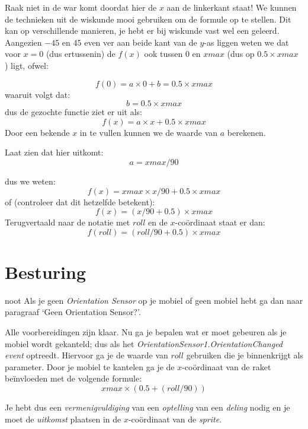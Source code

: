 Raak niet in de war komt doordat hier de $x$ aan de linkerkant staat! We kunnen de technieken uit de wiskunde mooi gebruiken om de formule op te stellen. Dit kan op verschillende manieren, je hebt er bij wiskunde vast wel een geleerd. Aangezien $-45$ en $45$ even ver aan beide kant van de $y$-as liggen weten we dat voor $x=0$ (dus ertussenin) de $f(x)$ ook tussen $0$ en $xmax$ (dus op $ 0.5 \times xmax $ ) ligt, ofwel:


\[
	f(0) = a \times 0 + b = 0.5 \times  xmax 
\]
waaruit volgt dat:
\[
	b = 0.5 \times xmax
\]
dus de gezochte functie ziet er uit als:
\[
	f(x) = a \times x + 0.5 \times xmax
\]
Door een bekende $x$ in te vullen kunnen we de waarde van $a$ berekenen. 

\begin{opgave}
   \opgVraag
	Laat zien dat hier uitkomt:
\[
	a=xmax/90
\]
\end{opgave}
dus we weten:
\[
	f(x) = xmax \times x/90 + 0.5 \times xmax
\]
of (controleer dat dit hetzelfde betekent):
\[
	f(x) = (x/90 + 0.5)  \times  xmax
\]
Terugvertaald naar de notatie met $roll$ en de $x$-co\"ordinaat staat er dan:
\[
	f(roll) = (roll/90 + 0.5)  \times  xmax
\]


\section{Besturing}
\begin{derivation}{noot}
  Als je geen \emph{Orientation Sensor} op je mobiel of geen mobiel hebt ga dan naar paragraaf `Geen Orientation Sensor?'.
\end{derivation}

Alle voorbereidingen zijn klaar. Nu ga je bepalen wat er moet gebeuren als je mobiel wordt gekanteld; dus als het \emph{OrientationSensor1.OrientationChanged} \emph{event} optreedt. Hiervoor ga je de waarde van $roll$ gebruiken die je binnenkrijgt als parameter. Door je mobiel te kantelen ga je de $x$-co\"ordinaat van de raket be\"invloeden met de volgende formule: 
\[
	xmax \times (0.5 + (roll/90))
\]

Je hebt dus een \emph{vermenigvuldiging} van een \emph{optelling} van een \emph{deling} nodig en je moet de \emph{uitkomst} plaatsen in de $x$-co\"ordinaat van de \emph{sprite}.

